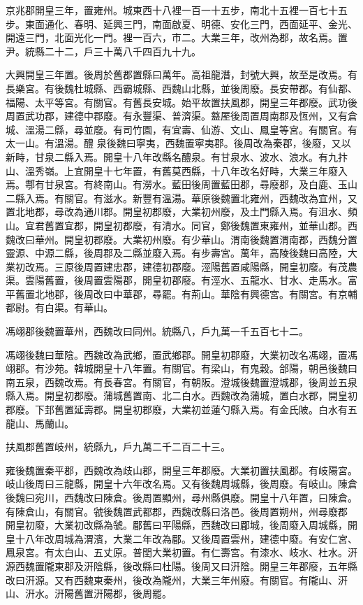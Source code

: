 \begin{pinyinscope}
 京兆郡開皇三年，置雍州。城東西十八裡一百一十五步，南北十五裡一百七十五步。東面通化、春明、延興三門，南面啟夏、明德、安化三門，西面延平、金光、開遠三門，北面光化一門。裡一百六，市二。大業三年，改州為郡，故名焉。置尹。統縣二十二，戶三十萬八千四百九十九。



 大興開皇三年置。後周於舊郡置縣曰萬年。高祖龍潛，封號大興，故至是改焉。有長樂宮。有後魏杜城縣、西霸城縣、西魏山北縣，並後周廢。長安帶郡。有仙都、福陽、太平等宮。有關官。有舊長安城。始平故置扶風郡，開皇三年郡廢。武功後周置武功郡，建德中郡廢。有永豐渠、普濟渠。盩厔後周置周南郡及恆州，又有倉城、溫湯二縣，尋並廢。有司竹園，有宜壽、仙游、文山、鳳皇等宮。有關官。有太一山。有溫湯。醴
 泉後魏曰寧夷，西魏置寧夷郡。後周改為秦郡，後廢，又以新畤，甘泉二縣入焉。開皇十八年改縣名醴泉。有甘泉水、波水、浪水。有九抃山、溫秀嶺。上宜開皇十七年置，有舊莫西縣，十八年改名好畤，大業三年廢入焉。鄠有甘泉宮。有終南山。有澇水。藍田後周置藍田郡，尋廢郡，及白鹿、玉山二縣入焉。有關官。有滋水。新豐有溫湯。華原後魏置北雍州，西魏改為宜州，又置北地郡，尋改為通川郡。開皇初郡廢，大業初州廢，及土門縣入焉。有沮水、頻山。宜君舊置宜郡，開皇初郡廢，有清水。同官，鄭後魏置東雍州，並華山郡。西魏改曰華州。開皇初郡廢。大業初州廢。有少華山。渭南後魏置渭南郡，西魏分置靈源、中源二縣，後周郡及二縣並廢入焉。有步壽宮。萬年，高陵後魏曰高陸，大業初改焉。三原後周置建忠郡，建德初郡廢。涇陽舊置咸陽縣，開皇初廢。有茂農渠。雲陽舊置，後周置雲陽郡，開皇初郡廢。有涇水、五龍水、甘水、走馬水。富平舊置北地郡，後周改曰中華郡，尋罷。有荊山。華陰有興德宮。有關宮。有京輔都尉。有白渠。有華山。



 馮翊郡後魏置華州，西魏改曰同州。統縣八，戶九萬一千五百七十二。



 馮翊後魏曰華陰。西魏改為武鄉，置武鄉郡。開皇初郡廢，大業初改名馮翊，置馮翊郡。有沙苑。韓城開皇十八年置。有關官。有梁山，有鬼穀。郃陽，朝邑後魏曰南五泉，西魏改焉。有長春宮。有關官，有朝阪。澄城後魏置澄城郡，後周並五泉縣入焉。開皇初郡廢。蒲城舊置南、北二白水。西魏改為蒲城，置白水郡，開皇初郡廢。下邽舊置延壽郡。開皇初郡廢，大業初並蓮勺縣入焉。有金氏陂。白水有五龍山、馬蘭山。



 扶風郡舊置岐州，統縣九，戶九萬二千二百二十三。



 雍後魏置秦平郡，西魏改為歧山郡，開皇三年郡廢。大業初置扶風郡。有岐陽宮。岐山後周曰三龍縣，開皇十六年改名焉。又有後魏周城縣，後周廢。有岐山。陳倉後魏曰宛川，西魏改曰陳倉。後周置顯州，尋州縣俱廢。開皇十八年置，曰陳倉。有陳倉山，有關官。虢後魏置武都郡，西魏改縣曰洛邑。後周置朔州，州尋廢郡
 開皇初廢，大業初改縣為虢。郿舊曰平陽縣，西魏改曰郿城，後周廢入周城縣，開皇十八年改周城為渭濱，大業二年改為郿。又後周置雲州，建德中廢。有安仁宮、鳳泉宮。有太白山、五丈原。普閏大業初置。有仁壽宮。有漆水、岐水、杜水。汧源西魏置隴東郡及汧陰縣，後改縣曰杜陽。後周又曰汧陰。開皇三年郡廢，五年縣改曰汧源。又有西魏東秦州，後改為隴州，大業三年州廢。有關官。有隴山、汧山、汧水。汧陽舊置汧陽郡，後周罷。




\end{pinyinscope}
